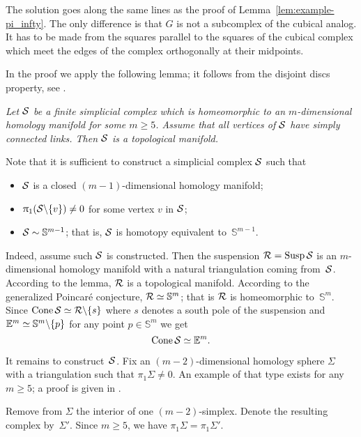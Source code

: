 The solution goes along the same lines as the proof of Lemma~\ref{lem:example-pi_infty}.
The only difference is that $G$
is not a subcomplex of the cubical analog.
It has to be made from the squares parallel to the squares of the cubical complex which meet the edges of the complex orthogonally at their midpoints. \qeds

In the proof we apply the following lemma; 
it follows from the disjoint discs property, see \cite{edwards, daverman}.

\medskip

\emph{Let $\mathcal{S}$ be a finite simplicial complex which 
is homeomorphic to an $m$-dimensional homology manifold for some $m\ge 5$.
Assume that  all vertices of
$\mathcal{S}$ have simply connected links.
Then $\mathcal{S}$ is a topological manifold.}

\medskip


Note that it is sufficient to construct a simplicial complex $\mathcal{S}$
such that 
\begin{itemize}
\item $\mathcal{S}$ is a closed $(m-1)$-dimensional homology manifold;
\item $\uppi_1(\mathcal{S}\backslash\{v\})\ne0$ for some vertex $v$ in $\mathcal{S}$;
\item $\mathcal{S}\sim \mathbb{S}^{m-1}$; that is, $\mathcal{S}$ is homotopy equivalent to~$\mathbb{S}^{m-1}$.
\end{itemize}

Indeed, assume such $\mathcal{S}$ is constructed.
Then the suspension
$\spc{R}\z=\Susp\spc{S}$
is an $m$-dimensional homology manifold with a natural triangulation coming from~$\mathcal{S}$.
According to the lemma,
$\mathcal{R}$ is a topological manifold.
According to the generalized Poincar\'{e} conjecture,
$\mathcal{R}\simeq\mathbb{S}^m$;
that is
$\mathcal{R}$ is homeomorphic to~$\mathbb{S}^m$.
Since $\mathop{\rm Cone}\nolimits \mathcal{S}\simeq \mathcal{R}\backslash\{s\}$ where $s$ denotes a south pole of the suspension 
and $\mathbb{E}^m\simeq \mathbb{S}^m\backslash\{p\}$
for any point $p\in \mathbb{S}^m$
we get 
\[\mathop{\rm Cone}\nolimits \mathcal{S}\simeq\mathbb{E}^m.\]

It remains to construct~$\mathcal{S}$.
Fix an $(m-2)$-dimensional homology sphere $\Sigma$ with a triangulation such that $\pi_1\Sigma\ne0$.
An example of that type exists for any $m\ge 5$; a proof is given in \cite{kervaire}.

Remove from $\Sigma$ the interior of one $(m-2)$-simplex.
Denote the resulting complex by~$\Sigma'$.
Since $m\ge 5$, we have $\pi_1\Sigma=\pi_1\Sigma'$.

